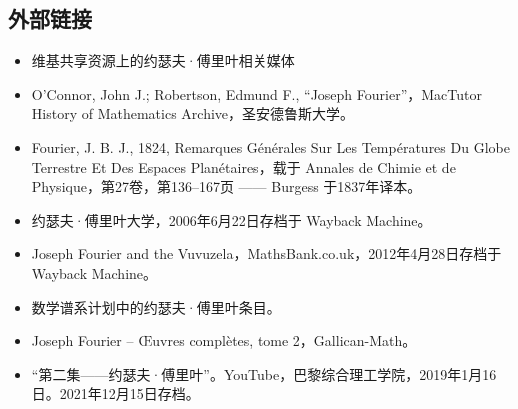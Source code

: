\subsection{外部链接}
\begin{itemize}
\item 维基共享资源上的约瑟夫·傅里叶相关媒体
\item O'Connor, John J.; Robertson, Edmund F., “Joseph Fourier”，MacTutor History of Mathematics Archive，圣安德鲁斯大学。
\item Fourier, J. B. J., 1824, Remarques Générales Sur Les Températures Du Globe Terrestre Et Des Espaces Planétaires，载于 Annales de Chimie et de Physique，第27卷，第136–167页 —— Burgess 于1837年译本。
\item 约瑟夫·傅里叶大学，2006年6月22日存档于 Wayback Machine。
\item Joseph Fourier and the Vuvuzela，MathsBank.co.uk，2012年4月28日存档于 Wayback Machine。
\item 数学谱系计划中的约瑟夫·傅里叶条目。
\item Joseph Fourier – Œuvres complètes, tome 2，Gallican-Math。
\item “第二集——约瑟夫·傅里叶”。YouTube，巴黎综合理工学院，2019年1月16日。2021年12月15日存档。
\end{itemize}